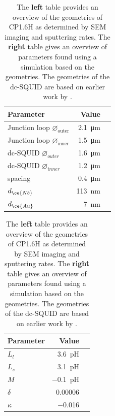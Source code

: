 \begin{table}
	\begin{subtable}{.5\linewidth}
		\centering
		\begin{tabular}{@{}lrr@{}}
			\toprule
			Parameter & Value \\ \midrule
			Junction loop $\diameter_{\text{outer}}$ & \qty{2.1}{\micro\meter} \\
			Junction loop $\diameter_{\text{inner}}$ & \qty{1.5}{\micro\meter} \\
			dc-SQUID $\diameter_{outer}$ & \qty{1.6}{\micro\meter} \\
			dc-SQUID $\diameter_{inner}$ & \qty{1.2}{\micro\meter} \\
			spacing & \qty{0.4}{\micro\meter} \\
			$d_{\ce{Nb}}$ & \qty{113}{\nano\meter} \\
			$d_{\ce{Au}}$ & \qty{7}{\nano\meter} \\
			\bottomrule
		\end{tabular}
    \end{subtable}
    \begin{subtable}{.5\linewidth}
    	\centering
    	\begin{tabular}{@{}lrr@{}}
    		\toprule
    		Parameter & Value \\ \midrule
    		$L_{l}$ & \qty{3.6}{\pico\henry} \\
			$L_{s}$ & \qty{3.1}{\pico\henry} \\
			$M$ & \qty{-0.1}{\pico\henry} \\
			$\delta$ & \num{0.00006} \\
			$\kappa$ & \num{-0.016} \\
    		\bottomrule
    	\end{tabular}
    \end{subtable}
    \caption{The \textbf{left} table provides an overview of the geometries of CP1.6H as determined by SEM imaging and sputtering rates. The \textbf{right} table gives an overview of parameters found using a simulation based on the geometries. The geometries of the dc-SQUID are based on earlier work by \citeauthor{rogSQUIDontipMagneticMicroscopy2022} \citeyear{rogSQUIDontipMagneticMicroscopy2022}.}
    \label{tab:CP1.6H-geometries}
\end{table}